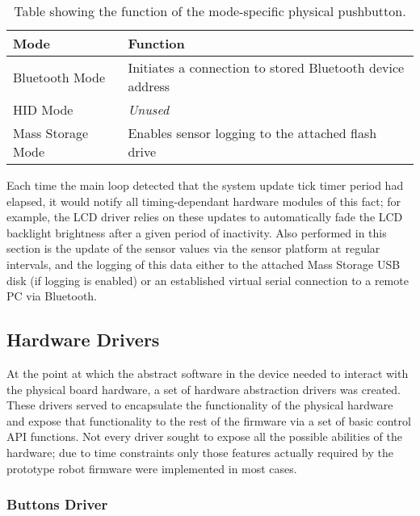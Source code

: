 \begin{table}[tbph]
	\vspace{1em}
	\begin{center}
		\begin{tabular}{ | l | l | }
			\hline
			\textbf{Mode} & \textbf{Function} \\ \hline

			Bluetooth Mode & Initiates a connection to stored Bluetooth device address \\ \hline
			HID Mode & \textit{Unused} \\ \hline
			Mass Storage Mode & Enables sensor logging to the attached flash drive \\ \hline
		\end{tabular}
		\caption[Mode Specific Button Roles]{Table showing the function of the mode-specific physical pushbutton.}
		\label{tab:buttonroles}
	\end{center}
\end{table}

Each time the main loop detected that the system update tick timer period had elapsed, it would notify all timing-dependant hardware modules of this fact; for example, the LCD driver relies on these updates to automatically fade the LCD backlight brightness after a given period of inactivity. Also performed in this section is the update of the sensor values via the sensor platform at regular intervals, and the logging of this data either to the attached Mass Storage USB disk (if logging is enabled) or an established virtual serial connection to a remote PC via Bluetooth.

\FloatBarrier
\subsection{Hardware Drivers}

At the point at which the abstract software in the device needed to interact with the physical board hardware, a set of hardware abstraction drivers was created. These drivers served to encapsulate the functionality of the physical hardware and expose that functionality to the rest of the firmware via a set of basic control API functions. Not every driver sought to expose all the possible abilities of the hardware; due to time constraints only those features actually required by the prototype robot firmware were implemented in most cases.

\FloatBarrier
\subsubsection{Buttons Driver}

